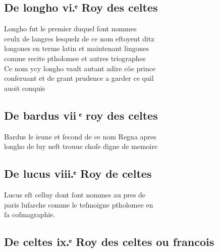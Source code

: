 \documentclass[12pt]{article}
\begin{document}
\subsection*{De longho vi.ͤ Roy des celtes}


Longho fut le premier duquel ſont nommes\\
ceulx de langres lesquelz de ce nom eſtoyent ditz\\
longones en terme
          latin et maintenant lingones\\
comme recite ptholomee et autres triographes\\
Ce nom ycy longho vault autant adire cõe
            prince\\
conſeruant et de grant prudence a garder ce quil\\
auoit
          conquis





\subsection*{De bardus vii ͤ roy des celtes}










\newpage




Bardus le ieune et ſecond de ce nom
          Regna apres\\
longho de luy neſt trouue choſe
          digne de memoire





\subsection*{De lucus viii.ͤ Roy de
          celtes}


Lucus eſt celluy dont ſont nommes au pres
            de\\
paris luſarche comme le teſmoigne ptholomee en\\
ſa coſmagraphie.





\subsection*{De celtes ix.ͤ Roy des
          celtes ou francois}
\end{document}
